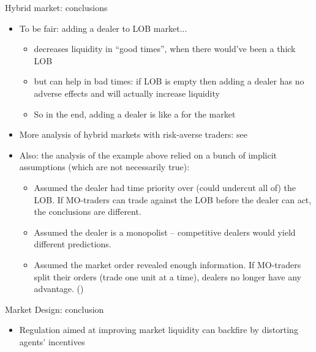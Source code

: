 \documentclass[english,10pt
,aspectratio=169
]{beamer}
\begin{document}
\begin{frame}{Hybrid market: conclusions}
	\begin{itemize}
		\item To be fair: adding a dealer to LOB market... 
		\begin{itemize}
			\item decreases liquidity in ``good times'', when there would've been a thick LOB
			\item but can help in bad times: if LOB is empty then adding a dealer has no adverse effects and will actually increase liquidity
			\item So in the end, adding a dealer is like a  for the market
		\end{itemize}
		\item More analysis of hybrid markets with risk-averse traders: see \cite{viswanathan_market_2002}
		\item Also: the analysis of the example above relied on a bunch of implicit assumptions (which are not necessarily true):
		\begin{itemize}
			\item Assumed the dealer had time priority over (could undercut all of) the LOB. If MO-traders can trade against the LOB before the dealer can act, the conclusions are different.
			\item Assumed the dealer is a monopolist -- competitive dealers would yield different predictions.
			\item Assumed the market order revealed enough information. If MO-traders split their orders (trade one unit at a time), dealers no longer have any advantage. (\cite{back_working_2007})
		\end{itemize}
	\end{itemize}
\end{frame}


\begin{frame}{Market Design: conclusion}
	\begin{itemize}
		\item Regulation aimed at improving market liquidity can backfire by distorting agents' incentives
	\end{itemize}
\end{frame}
\end{document}
